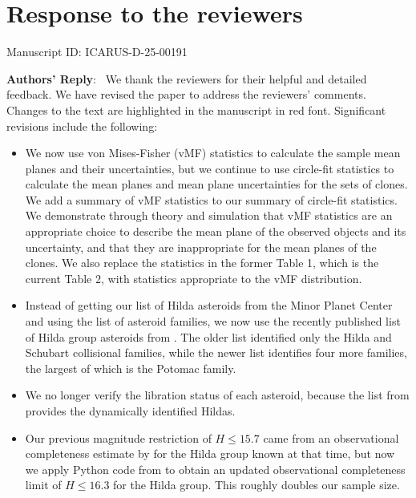 \documentclass[11pt]{article}
\newcounter{reviewer}
\newenvironment{reply}
   {\medskip \noindent \begin{sf}\textbf{Authors' Reply}:\  }
   {\medskip \end{sf}\medskip}
\begin{document}
\setcounter{figure}{0}
\renewcommand{\figurename}{Fig.}
\renewcommand{\thefigure}{R\arabic{figure}}

\section*{Response to the reviewers}
 Manuscript ID: ICARUS-D-25-00191

\begin{reply}
We thank the reviewers for their helpful and detailed feedback.
We have revised the paper to address the reviewers' comments.
Changes to the text are highlighted in the manuscript in red font.
Significant revisions include the following: 
\begin{itemize}
\item We now use von Mises-Fisher (vMF) statistics to calculate the sample mean planes and their uncertainties, but we continue to use circle-fit statistics to calculate the mean planes and mean plane uncertainties for the sets of clones. 
We add a summary of vMF statistics to our summary of circle-fit statistics. We demonstrate through theory and simulation that vMF statistics are an appropriate choice to describe the mean plane of the observed objects and its uncertainty, and that they are inappropriate for the mean planes of the clones. 
We also replace the statistics in the former Table 1, which is the current Table 2, with statistics appropriate to the vMF distribution.
\item Instead of getting our list of Hilda asteroids from the Minor Planet Center and using the \citet{nesvorny2015identification} list of asteroid families, we now use the recently published list of Hilda group asteroids from \citet{vokrouhlicky2025orbital}.
The older list identified only the Hilda and Schubart collisional families, while the newer list identifies four more families, the largest of which is the Potomac family.
\item We no longer verify the libration status of each asteroid, because the list from \citet{vokrouhlicky2025orbital} provides the dynamically identified Hildas.
\item Our previous magnitude restriction of $H\leq15.7$ came from an observational completeness estimate by \citet{hendler2020observational} for the Hilda group known at that time, but now we apply Python code from \citet{hendler2020observational} to obtain an updated observational completeness limit of $H\leq16.3$ for the Hilda group. This roughly doubles our sample size.

\end{itemize}
\end{reply}
\end{document}

